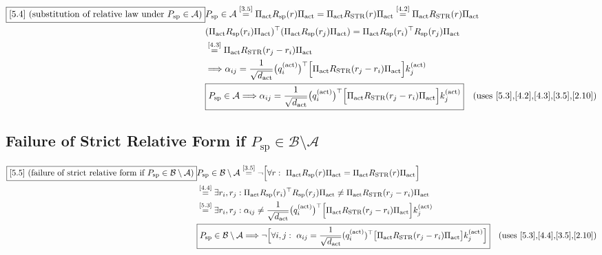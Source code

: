 \documentclass[11pt]{article}
\newcommand{\eqref}[1]{\overset{[#1]}{=}}
\begin{document}
\begin{align}
\boxed{[5.4] \text{ (substitution of relative law under }P_{\mathrm{sp}}\in\mathcal{A}\text{)}}
&P_{\mathrm{sp}}
\in
\mathcal{A}
\eqref{3.5}
\Pi_{\mathrm{act}}
R_{\mathrm{sp}}(r)
\Pi_{\mathrm{act}}
=
\Pi_{\mathrm{act}}
R_{\mathrm{STR}}(r)
\Pi_{\mathrm{act}}
\eqref{4.2}
\Pi_{\mathrm{act}}
R_{\mathrm{STR}}(r)
\Pi_{\mathrm{act}} \notag\\
&(\Pi_{\mathrm{act}}
R_{\mathrm{sp}}(r_i)
\Pi_{\mathrm{act}})^\top
(\Pi_{\mathrm{act}}
R_{\mathrm{sp}}(r_j)
\Pi_{\mathrm{act}})
=
\Pi_{\mathrm{act}}
R_{\mathrm{sp}}(r_i)^\top
R_{\mathrm{sp}}(r_j)
\Pi_{\mathrm{act}} \notag\\
&\eqref{4.3}
\Pi_{\mathrm{act}}
R_{\mathrm{STR}}(r_j-r_i)
\Pi_{\mathrm{act}} \notag\\
&\Longrightarrow
\alpha_{ij}
=
\frac{1}{\sqrt{d_{\mathrm{act}}}}

\big(
q_i^{(\mathrm{act})}
\big)^\top
\Big[
\Pi_{\mathrm{act}}
R_{\mathrm{STR}}(r_j-r_i)
\Pi_{\mathrm{act}}
\Big]
k_j^{(\mathrm{act})} \notag\\
&\boxed{
P_{\mathrm{sp}}\in\mathcal{A}
\Longrightarrow
\alpha_{ij}
=
\frac{1}{\sqrt{d_{\mathrm{act}}}}

\big(
q_i^{(\mathrm{act})}
\big)^\top
\Big[
\Pi_{\mathrm{act}}
R_{\mathrm{STR}}(r_j-r_i)
\Pi_{\mathrm{act}}
\Big]
k_j^{(\mathrm{act})}
}
\quad(\text{uses [5.3],[4.2],[4.3],[3.5],[2.10]})
\end{align}

\subsection{Failure of Strict Relative Form if $P_{\mathrm{sp}}\in\mathcal{B}\setminus\mathcal{A}$}

\begin{align}
\boxed{[5.5] \text{ (failure of strict relative form if }P_{\mathrm{sp}}\in\mathcal{B}\setminus\mathcal{A}\text{)}}
&P_{\mathrm{sp}}
\in
\mathcal{B}\setminus\mathcal{A}
\eqref{3.5}
\neg\Big[
\forall r:\
\Pi_{\mathrm{act}}
R_{\mathrm{sp}}(r)
\Pi_{\mathrm{act}}
=
\Pi_{\mathrm{act}}
R_{\mathrm{STR}}(r)
\Pi_{\mathrm{act}}
\Big] \notag\\
&\eqref{4.4}
\exists r_i,r_j:
\Pi_{\mathrm{act}}
R_{\mathrm{sp}}(r_i)^\top
R_{\mathrm{sp}}(r_j)
\Pi_{\mathrm{act}}
\neq
\Pi_{\mathrm{act}}
R_{\mathrm{STR}}(r_j-r_i)
\Pi_{\mathrm{act}} \notag\\
&\eqref{5.3}
\exists r_i,r_j:
\alpha_{ij}
\neq
\frac{1}{\sqrt{d_{\mathrm{act}}}}

\big(
q_i^{(\mathrm{act})}
\big)^\top
\Big[
\Pi_{\mathrm{act}}
R_{\mathrm{STR}}(r_j-r_i)
\Pi_{\mathrm{act}}
\Big]
k_j^{(\mathrm{act})} \notag\\
&\boxed{
P_{\mathrm{sp}}
\in
\mathcal{B}\setminus\mathcal{A}
\Longrightarrow
\neg\Big[
\forall i,j:\
\alpha_{ij}
=
\frac{1}{\sqrt{d_{\mathrm{act}}}}

(q_i^{(\mathrm{act})})^\top
\big[
\Pi_{\mathrm{act}}
R_{\mathrm{STR}}(r_j-r_i)
\Pi_{\mathrm{act}}
\big]
k_j^{(\mathrm{act})}
\Big]
}
\quad(\text{uses [5.3],[4.4],[3.5],[2.10]})
\end{align}
\end{document}
